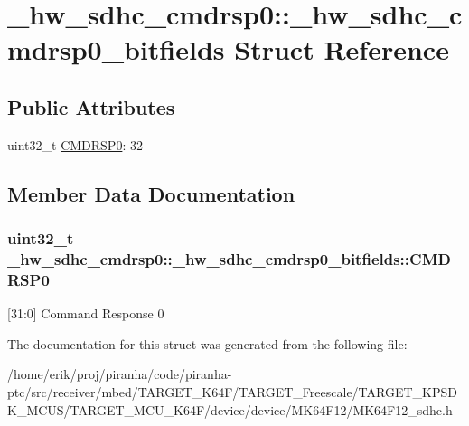 \hypertarget{struct__hw__sdhc__cmdrsp0_1_1__hw__sdhc__cmdrsp0__bitfields}{}\section{\+\_\+hw\+\_\+sdhc\+\_\+cmdrsp0\+:\+:\+\_\+hw\+\_\+sdhc\+\_\+cmdrsp0\+\_\+bitfields Struct Reference}
\label{struct__hw__sdhc__cmdrsp0_1_1__hw__sdhc__cmdrsp0__bitfields}
\subsection*{Public Attributes}
\begin{DoxyCompactItemize}
\item 
uint32\+\_\+t \hyperlink{struct__hw__sdhc__cmdrsp0_1_1__hw__sdhc__cmdrsp0__bitfields_ac4bc0c08f99a0bea25d9ae642b1a6665}{C\+M\+D\+R\+S\+P0}\+: 32
\end{DoxyCompactItemize}


\subsection{Member Data Documentation}
\subsubsection[{\texorpdfstring{C\+M\+D\+R\+S\+P0}{CMDRSP0}}]{\setlength{\rightskip}{0pt plus 5cm}uint32\+\_\+t \+\_\+hw\+\_\+sdhc\+\_\+cmdrsp0\+::\+\_\+hw\+\_\+sdhc\+\_\+cmdrsp0\+\_\+bitfields\+::\+C\+M\+D\+R\+S\+P0}\hypertarget{struct__hw__sdhc__cmdrsp0_1_1__hw__sdhc__cmdrsp0__bitfields_ac4bc0c08f99a0bea25d9ae642b1a6665}{}\label{struct__hw__sdhc__cmdrsp0_1_1__hw__sdhc__cmdrsp0__bitfields_ac4bc0c08f99a0bea25d9ae642b1a6665}
\mbox{[}31\+:0\mbox{]} Command Response 0 

The documentation for this struct was generated from the following file\+:\begin{DoxyCompactItemize}
\item 
/home/erik/proj/piranha/code/piranha-\/ptc/src/receiver/mbed/\+T\+A\+R\+G\+E\+T\+\_\+\+K64\+F/\+T\+A\+R\+G\+E\+T\+\_\+\+Freescale/\+T\+A\+R\+G\+E\+T\+\_\+\+K\+P\+S\+D\+K\+\_\+\+M\+C\+U\+S/\+T\+A\+R\+G\+E\+T\+\_\+\+M\+C\+U\+\_\+\+K64\+F/device/device/\+M\+K64\+F12/M\+K64\+F12\+\_\+sdhc.\+h\end{DoxyCompactItemize}
